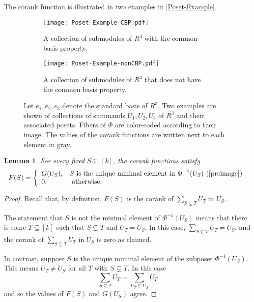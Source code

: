 \documentclass[a4paper]{amsart}
\numberwithin{theoremcounter}{section}
\newtheorem{lemma}[lemmaauto]{Lemma}
\theoremstyle{definition}
\theoremstyle{remark}
\begin{document}
The corank function is illustrated in two examples in \autoref{Poset-Example}. 

 \begin{figure}[h!]
    \begin{subfigure}[t]{.4\textwidth} \hspace{-2em}
\texttt{[image: Poset-Example-CBP.pdf]}  
      \caption{A collection of submodules of $R^3$ with the common basis property.}
    \end{subfigure} \hfill 
    \begin{subfigure}[t]{.4\textwidth} 
   \texttt{[image: Poset-Example-nonCBP.pdf]} 
      \caption{A collection of submodules of $R^3$ that does not have the common basis property.}
    \end{subfigure}
  \caption{ Let $e_1, e_2, e_3$ denote the standard basis of $R^3$. Two examples are shown of collections of summands $U_1, U_2, U_3$ of $R^3$ and their associated posets. Fibers of $\Phi$ are color-coded according to their image. The values of the corank functions are written next to each element in gray. } 
  \label{Poset-Example}
  \end{figure}


\begin{lemma} \label{FvsG}  For every fixed $S \subseteq [k]$, the corank functions satisfy
$$ F(S) = \left\{ \begin{array}{ll} G(U_S), & \text{$S$ is the unique minimal element in $\Phi^{-1}(U_S)$ (\autoref{preimage})} \\ 0, & \text{ otherwise}. \end{array} \right.
$$ 
\end{lemma} 
\begin{proof}  
Recall that, by definition, $F(S)$ is the corank of   $\sum_{S \subsetneq T}  U_T$ in $U_S$. 


The statement that $S$ is not the minimal element of $\Phi^{-1}(U_S)$ means that there is some $T \subseteq [k]$ such that $S \subsetneq T$ and $U_T = U_S$. In this case, $\sum_{S \subsetneq T}  U_T  = U_S$, and the corank of $\sum_{S \subsetneq T}  U_T$ in $U_S$ is zero as claimed. 

In contrast, suppose $S$ is the unique minimal element of the subposet $\Phi^{-1}(U_S)$. This means $U_T \neq U_S$ for all $T$ with $S \subsetneq T$. In this case 
$$ \sum_{S \subsetneq T}  U_T  = \sum_{U_T \subsetneq U_S} U_T $$ 
and so the values of $F(S)$ and $G(U_S)$ agree. 
\end{proof} 
\end{document}
